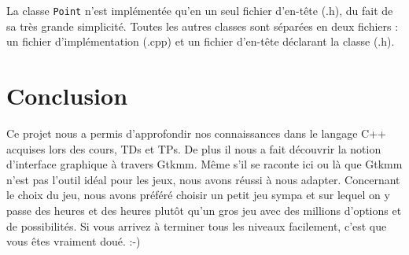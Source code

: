 \documentclass[a4paper,11pt,oneside]{article}
\begin{document}
La classe \verb|Point| n'est implémentée qu'en un seul fichier d'en-tête (.h), du fait de sa très grande simplicité. Toutes les autres
classes sont séparées en deux fichiers : un fichier d'implémentation (.cpp) et un fichier d'en-tête déclarant la classe (.h).


\newpage
\section{Conclusion}

Ce projet nous a permis d'approfondir nos connaissances dans le langage C++ acquises lors des cours, TDs et TPs.
De plus il nous a fait découvrir la notion d'interface graphique à travers Gtkmm. Même s'il se raconte ici ou là que Gtkmm n'est pas l'outil
idéal pour les jeux, nous avons réussi à nous adapter. Concernant le choix du jeu, nous avons préféré choisir un petit jeu sympa et sur
lequel on y passe des heures et des heures plutôt qu'un gros jeu avec des millions d'options et de possibilités. Si vous arrivez à terminer
tous les niveaux facilement, c'est que vous êtes vraiment doué. :-)
\end{document}
